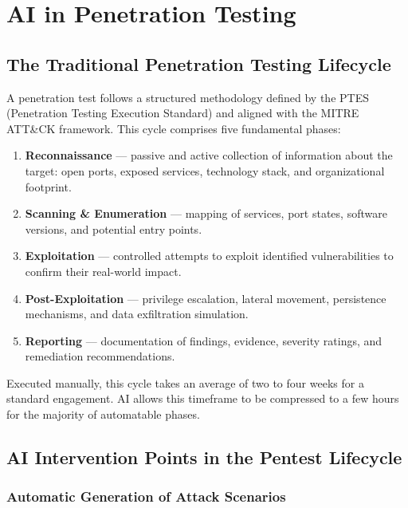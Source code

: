 \documentclass[12pt,a4paper]{report}
\begin{document}
\section{AI in Penetration Testing}

\subsection{The Traditional Penetration Testing Lifecycle}

A penetration test follows a structured methodology defined by the PTES
(Penetration Testing Execution Standard) and aligned with the MITRE ATT\&CK
framework. This cycle comprises five fundamental phases:

\begin{enumerate}
    \item \textbf{Reconnaissance} --- passive and active collection of information
    about the target: open ports, exposed services, technology stack, and
    organizational footprint.
    \item \textbf{Scanning \& Enumeration} --- mapping of services, port states,
    software versions, and potential entry points.
    \item \textbf{Exploitation} --- controlled attempts to exploit identified
    vulnerabilities to confirm their real-world impact.
    \item \textbf{Post-Exploitation} --- privilege escalation, lateral movement,
    persistence mechanisms, and data exfiltration simulation.
    \item \textbf{Reporting} --- documentation of findings, evidence, severity
    ratings, and remediation recommendations.
\end{enumerate}

Executed manually, this cycle takes an average of two to four weeks for a standard
engagement. AI allows this timeframe to be compressed to a few hours for the
majority of automatable phases.

\subsection{AI Intervention Points in the Pentest Lifecycle}

\subsubsection{Automatic Generation of Attack Scenarios}
\end{document}
